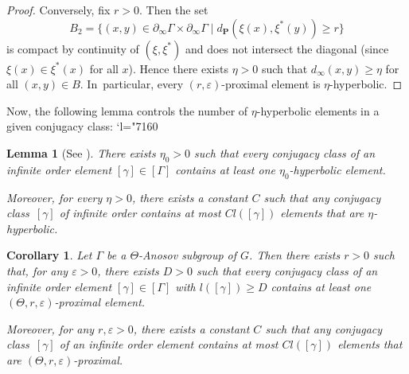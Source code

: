 \documentclass[JEP,XML,SOM,Unicode,NoEqCountersInSection,NoFloatCountersInSection,published]{cedram}
\newcommand{\Changel}{\mathcode`l="7160}
\newtheorem{coro}[theo]{Corollary}
\newtheorem{lemma}[theo]{Lemma}
\theoremstyle{definition}
\newcommand{\proj}{\mathbf{P}}
\let\epsilon\varepsilon
\let\G\Gamma
\let\g\gamma
\begin{document}
\begin{proof}
Conversely, fix $r>0$. Then the set
\[
B_2 = \{(x,y)\in \partial_\infty \Gamma \times \partial_\infty \Gamma \mid d_\proj(\xi(x),\xi^*(y)) \geq r\}
\]
is compact by continuity of $(\xi,\xi^*)$ and does not intersect the diagonal (since $\xi(x)\in \xi^*(x)$ for all $x$). Hence there exists $\eta>0$ such that $d_\infty(x,y)\geq \eta$ for all $(x,y)\in B$. In~particular, every $(r,\epsilon)$-proximal element is $\eta$-hyperbolic.
\end{proof}

Now, the following lemma controls the number of $\eta$-hyperbolic elements in a given conjugacy class:
\Changel

\begin{lemma}[See {\cite[\S 7]{CK}}] \label{lem - HyperbolicConjugacies}
There exists $\eta_0>0$ such that every conjugacy class of an infinite order element $[\g]\in [\G]$ contains at least one $\eta_0$-hyperbolic element.

Moreover, for every $\eta>0$, there exists a constant $C$ such that any conjugacy class~$[\g]$ of infinite order contains at most $C l([\g])$ elements that are $\eta$-hyperbolic.
\end{lemma}

\begin{coro} \label{lem - ProximalConjugacyClass}
Let $\Gamma$ be a $\Theta$-Anosov subgroup of $G$. Then there exists $r>0$ such that, for any $\epsilon>0$, there exists $D>0$ such that every conjugacy class of an infinite order element $[\g]\in [\Gamma]$ with $l([\g]) \geq D$ contains at least one $(\Theta,r,\epsilon)$-proximal element.

Moreover, for any $r,\epsilon>0$, there exists a constant $C$ such that any conjugacy class~$[\g]$ of an infinite order element contains at most $C l([\g])$ elements that are $(\Theta,r,\epsilon)$\nobreakdash-prox\-imal.
\end{coro}
\end{document}
